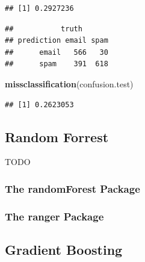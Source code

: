 \documentclass[]{book}
\newenvironment{Shaded}{\begin{snugshade}}{\end{snugshade}}
\newcommand{\KeywordTok}[1]{\textcolor[rgb]{0.13,0.29,0.53}{\textbf{#1}}}
\newcommand{\DataTypeTok}[1]{\textcolor[rgb]{0.13,0.29,0.53}{#1}}
\newcommand{\DecValTok}[1]{\textcolor[rgb]{0.00,0.00,0.81}{#1}}
\newcommand{\StringTok}[1]{\textcolor[rgb]{0.31,0.60,0.02}{#1}}
\newcommand{\CommentTok}[1]{\textcolor[rgb]{0.56,0.35,0.01}{\textit{#1}}}
\newcommand{\OperatorTok}[1]{\textcolor[rgb]{0.81,0.36,0.00}{\textbf{#1}}}
\newcommand{\NormalTok}[1]{#1}
\theoremstyle{definition}
\theoremstyle{definition}
\theoremstyle{definition}
\theoremstyle{remark}
\begin{document}
\begin{verbatim}
## [1] 0.2927236
\end{verbatim}

\begin{Shaded}
\end{Shaded}

\begin{verbatim}
##           truth
## prediction email spam
##      email   566   30
##      spam    391  618
\end{verbatim}

\begin{Shaded}
\begin{Highlighting}[]
\KeywordTok{missclassification}\NormalTok{(confusion.test)}
\end{Highlighting}
\end{Shaded}

\begin{verbatim}
## [1] 0.2623053
\end{verbatim}

\subsection{Random Forrest}\label{random-forrest}

TODO

\subsubsection{The randomForest Package}\label{the-randomforest-package}

\subsubsection{The ranger Package}\label{the-ranger-package}

\subsection{Gradient Boosting}\label{gradient-boosting}
\end{document}
